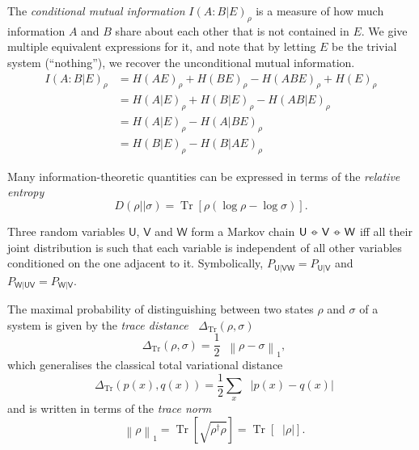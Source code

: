 \documentclass[10pt, a4paper]{article}
\numberwithin{equation}{section} %
\theoremstyle{definition}
\theoremstyle{plain}
\newcommand{\norm}[1]{\mathop{}\left\lVert#1\right\rVert}
\newcommand{\abs}[1]{\mathop{}\left\lvert#1\right\rvert}
\newcommand{\?}{\mathrel{?}} %
\newcommand*\markov{\mathrel{\ooalign{\hidewidth$\circ$\hidewidth\cr$-$\cr}}} %
\newcommand{\Tr}[2][]{\mathop{\mathrm{Tr}#1}\left[ #2 \right]} %
\newcommand{\Trdist}[2]{\mathop{}\Delta_\mathrm{Tr}\left(#1, #2\right)}
\newcommand{\crv}[1]{\mathsf{#1}}
\begin{document}
\begin{appendices}
                    The \emph{conditional mutual information} \(I{(A:B|E)}_{\rho}\) is a measure of how much information \(A\) and \(B\) share about each other that is not contained in \(E\). We give multiple equivalent expressions for it, and note that by letting \(E\) be the trivial system (``nothing''), we recover the unconditional mutual information.
                    \begin{align}
                      I{(A:B|E)}_{\rho} &= H{(AE)}_{\rho} + H{(BE)}_{\rho} - H{(ABE)}_{\rho} + H{(E)}_{\rho} \\
                                        &= H{(A|E)}_{\rho} + H{(B|E)}_{\rho} - H{(AB|E)}_{\rho} \\
                                        &= H{(A|E)}_{\rho} - H{(A|BE)}_{\rho} \\
                                        &= H{(B|E)}_{\rho} - H{(B|AE)}_{\rho}
                    \end{align}

                  Many information-theoretic quantities can be expressed in terms of the \emph{relative entropy}
                  \begin{equation}
                    D(\rho||\sigma) = \Tr{ \rho (\log \rho - \log \sigma) }.
                  \end{equation}

                  Three random variables \(\crv{U}\), \(\crv{V}\) and \(\crv{W}\) form a Markov chain \(\crv{U} \markov \crv{V} \markov \crv{W}\) iff all their joint distribution is such that each variable is independent of all other variables conditioned on the one adjacent to it. Symbolically, \(P_{\crv{U}|\crv{VW}} = P_{\crv{U}|\crv{V}}\) and \(P_{\crv{W}|\crv{UV}} = P_{\crv{W}|\crv{V}}\).

      The maximal probability of distinguishing between two states \(\rho\) and \(\sigma\) of a system is given by the \emph{trace distance} \(\Trdist{\rho}{\sigma}\) 
      \begin{equation}
      \Trdist{\rho}{\sigma} = \frac{1}{2}\norm{\rho - \sigma}_1,
      \end{equation}
      which generalises the classical total variational distance
      \[ \Trdist{p(x)}{q(x)} = \frac{1}{2} \sum_{x} \abs{p(x)-q(x)} \]
      and is written in terms of the \emph{trace norm}
      \begin{equation}
        \norm{\rho}_1 = \Tr{ \sqrt{\rho^{\dagger}\rho} } = \Tr{\abs{\rho}}.
      \end{equation}



\end{appendices}
\end{document}
